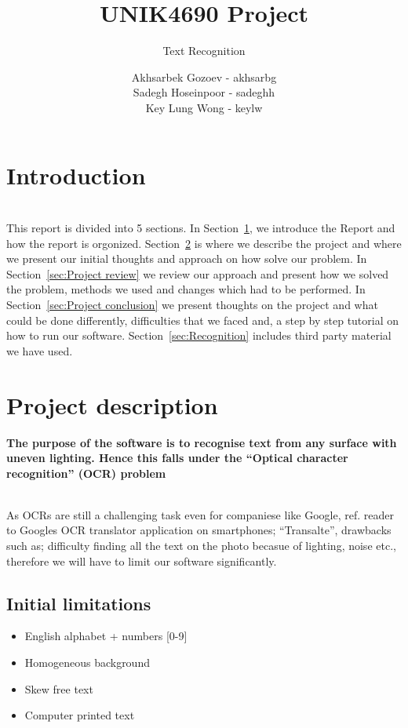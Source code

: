 \documentclass[11pt,a4paper,UKenglish]{article}
\title{UNIK4690 Project}
\subtitle{Text Recognition}
\author{
  Akhsarbek Gozoev  - akhsarbg \\
  Sadegh Hoseinpoor - sadeghh\\
  Key Lung Wong - keylw
}
\begin{document}
\ififorside[kind={Report}]

\newpage
\tableofcontents
\newpage
\section{Introduction}
\label{sec:Introduction}
\noindent \\ This report is divided into 5 sections. In Section~\ref{sec:Introduction}, we introduce the
Report and how the report is orgonized. Section~\ref{sec:Project description} is
where we describe the project and where we present our initial thoughts and
approach on how solve our problem. In Section~\ref{sec:Project review} we
review our approach and present how we solved the problem, methods we used and
changes which had to be performed. In Section~\ref{sec:Project conclusion} we
present thoughts on the project and what could be done differently,
difficulties that we faced and, a step by step tutorial on how to run our
software. Section~\ref{sec:Recognition} includes third party material we have used.


\newpage
\section{Project description}
\label{sec:Project description}
\textbf{The purpose of the software is to recognise text from any
surface with uneven lighting. Hence this falls under the ``Optical
character recognition'' (OCR) problem}

\noindent \\ As OCRs are still a challenging task even for companiese like
Google, ref. reader to Googles OCR translator application on smartphones;
``Transalte'', drawbacks such as; difficulty finding all the text on the photo
becasue of lighting, noise etc., therefore we will have to limit our software
significantly.


\subsection{Initial limitations}
\begin{itemize}
 \item{English alphabet + numbers [0-9]}
 \item{Homogeneous background}
 \item{Skew free text}
 \item{Computer printed text}
\end{itemize}
\end{document}
